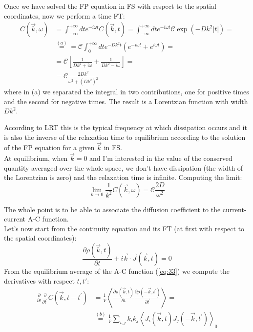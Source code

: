 \documentclass[\main/main.tex]{subfiles}
\begin{document}
Once we have solved the FP equation in FS with respect to the spatial coordinates, now we perform a time FT:
\begin{align}
    C(\vec{k}, \omega) &=\int_{-\infty}^{+\infty} d t e^{-i \omega t} C(\vec{k}, t) = \int_{-\infty}^{+\infty} d t e^{-i \omega t} \mathscr{C}\exp \left(-D k^{2} |t|\right) = \\
    &\overset{(a)}{=} =\mathscr{C} \int_{0}^{+\infty} d t e^{-D k^{2} t}\left(e^{-i \omega t}+e^{i \omega t}\right) = \\
    &=\mathscr{C}\left[\frac{1}{D k^{2}+i \omega}+\frac{1}{D k^{2}-i \omega}\right] = \\
    &=\mathscr{C} \frac{2 D k^{2}}{\omega^{2}+\left(D k^{2}\right)^{2}}
\end{align}
where in (a) we separated the integral in two contributions, one for positive times and the second for negative times. The result is a Lorentzian function with width $Dk^2$.

According to LRT this is the typical frequency at which dissipation occurs and it is  also the inverse of the relaxation time to equilibrium according to the solution of the FP equation for a given $\vec{k}$ in FS. \\

At equilibrium, when $\vec{k}=0$ and I'm interested in the value of the conserved quantity averaged over the whole space, we don't have dissipation (the width of the Lorentzian is zero) and the relaxation time is infinite. Computing the limit:
\begin{equation}
   \boxed{ \lim _{k \rightarrow 0} \frac{1}{k^{2}} C(\vec{k}, \omega)=\mathscr{C} \frac{2 D}{\omega^{2}}}
   \label{eq:star}
\end{equation}

The whole point is to be able to associate the diffusion coefficient to the current- current A-C function. \\

Let's now start from the continuity equation and its FT (at first with respect to the spatial coordinates):
\begin{equation}
    \frac{\partial \rho(\vec{k}, t)}{\partial t}+i \vec{k} \cdot \vec{J}(\vec{k}, t)=0
\end{equation}
From the equilibrium average of the A-C function (\ref{eq:33}) we compute the derivatives with respect $t,t'$:
\begin{align}
    \frac{\partial}{\partial t} \frac{\partial}{\partial t^{\prime}} C\left(\vec{k}, t-t^{\prime}\right)&=\frac{1}{V}\left\langle \frac{\partial \rho(\vec{k}, t)}{\partial t} \frac{\partial \rho\left(-\vec{k}, t^{\prime}\right)}{\partial t^{\prime}}\right\rangle = \\
    &\overset{(b)}{=} \frac{1}{V} \sum_{i, j} k_{i} k_{j}\left\langle J_{i}(\vec{k}, t) J_{j}\left(-\vec{k}, t^{\prime}\right)\right\rangle_{0}
    \label{eq:miam}
\end{align}
\end{document}
